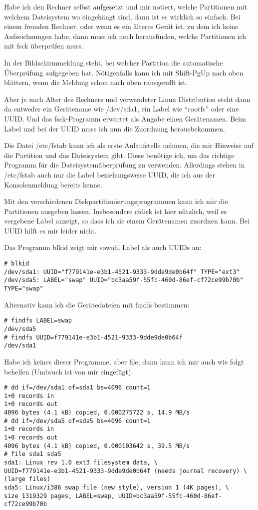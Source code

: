 Habe ich den Rechner selbst aufgesetzt und mir notiert, welche Partitionen mit
welchem Dateisystem wo eingehängt sind, dann ist es wirklich so einfach. Bei
einem fremden Rechner, oder wenn es ein älteres Gerät ist, zu dem ich keine
Aufzeichnungen habe, dann muss ich noch herausfinden, welche Partitionen ich
mit fsck überprüfen muss.

In der Bildschirmmeldung steht, bei welcher Partition die automatische
Überprüfung aufgegeben hat. Nötigenfalls kann ich mit Shift-PgUp nach oben
blättern, wenn die Meldung schon nach oben rausgerollt ist.

Aber je nach Alter des Rechners und verwendeter Linux Distribution steht dann
da entweder ein Gerätename wie /dev/sda1, ein Label wie ``rootfs'' oder eine
UUID. Und das fsck-Programm erwartet als Angabe einen Gerätenamen. Beim Label
und bei der UUID muss ich nun die Zuordnung herausbekommen.

Die Datei /etc/fstab kann ich als erste Anlaufstelle nehmen, die mir Hinweise
auf die Partition und das Dateisystem gibt. Diese benötige ich, um das
richtige Programm für die Dateisystemüberprüfung zu verwenden. Allerdings
stehen in /etc/fstab auch nur die Label beziehungsweise UUID, die ich aus der
Konsolenmeldung bereits kenne.

Mit den verschiedenen Diskpartitionierungsprogrammen kann ich mir die
Partitionen ausgeben lassen. Insbesondere cfdisk ist hier nützlich, weil es
vergebene Label anzeigt, so dass ich sie einem Gerätenamen zuordnen kann. Bei
UUID hilft es mir leider nicht.

Das Programm blkid zeigt mir sowohl Label als auch UUIDs an:
\begin{verbatim}
# blkid
/dev/sda1: UUID="f779141e-e3b1-4521-9333-9dde9de0b64f" TYPE="ext3" 
/dev/sda5: LABEL="swap" UUID="bc3aa59f-55fc-460d-86ef-cf72ce99b70b" TYPE="swap" 
\end{verbatim}

Alternativ kann ich die Gerätedateien mit findfs bestimmen:
\begin{verbatim}
# findfs LABEL=swap
/dev/sda5
# findfs UUID=f779141e-e3b1-4521-9333-9dde9de0b64f
/dev/sda1
\end{verbatim}

Habe ich keines dieser Programme, aber file, dann kann ich mir auch wie folgt
behelfen (Umbruch ist von mir eingefügt):
\begin{verbatim}
# dd if=/dev/sda1 of=sda1 bs=4096 count=1
1+0 records in
1+0 records out
4096 bytes (4.1 kB) copied, 0.000275722 s, 14.9 MB/s
# dd if=/dev/sda5 of=sda5 bs=4096 count=1
1+0 records in
1+0 records out
4096 bytes (4.1 kB) copied, 0.000103642 s, 39.5 MB/s
# file sda1 sda5
sda1: Linux rev 1.0 ext3 filesystem data, \
UUID=f779141e-e3b1-4521-9333-9dde9de0b64f (needs journal recovery) \
(large files)
sda5: Linux/i386 swap file (new style), version 1 (4K pages), \
size 1319329 pages, LABEL=swap, UUID=bc3aa59f-55fc-460d-86ef-cf72ce99b70b
\end{verbatim}

